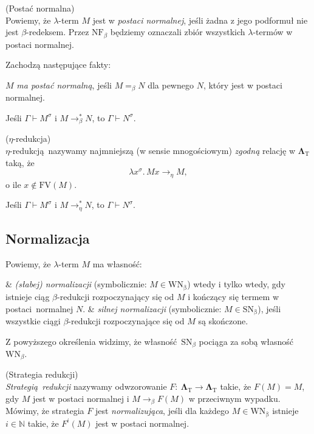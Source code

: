 \begin{definicja}\label{def:postac-normalna}(Postać normalna)\\
  Powiemy, że \(\lambda\)-term \(M\) jest w \emph{postaci normalnej}, jeśli żadna z jego podformuł nie jest \(\beta\)-redeksem. Przez \(\mathrm{NF}_{\beta}\) będziemy oznaczali zbiór wszystkich \(\lambda\)-termów w postaci normalnej.
\end{definicja}    

Zachodzą następujące fakty:
\begin{fakt}
\(M\) \emph{ma postać normalną}, jeśli \(M=_{\beta}N\) dla pewnego \(N\), który jest w postaci normalnej.
\end{fakt}
\begin{fakt}
  Jeśli \(\Gamma\vdash M^\sigma\) i \(M\longrightarrow^{*}_{\beta}N\), to
  \(\Gamma\vdash N^\sigma\).
\end{fakt}
  
  \begin{definicja}(\(\eta\)-redukcja)\\
\(\eta\)-redukcją nazywamy najmniejszą (w sensie mnogościowym) \emph{zgodną} relację w \(\mathbf{\Lambda}_{\mathrm{T}}\) taką, że
  \[
    \lambda x^\sigma.\, Mx\longrightarrow_{\eta} M,
  \]
    o ile \(x\not\in \mathrm{FV}(M)\).
  \end{definicja}

  \begin{fakt}
    Jeśli \(\Gamma\vdash M^\sigma\) i \(M\longrightarrow^{*}_{\eta}N\), to
    \(\Gamma\vdash N^\sigma\).
  \end{fakt}

\subsection{Normalizacja}
\noindent Powiemy, że \(\lambda\)-term \(M\) ma własność:
\begin{easylist}
  & \emph{(słabej) normalizacji} (symbolicznie: \(M\in\mathrm{WN_{\beta}}\)) wtedy i tylko wtedy, gdy istnieje ciąg \(\beta\)-redukcji rozpoczynający się od \(M\) i kończący się termem w postaci normalnej \(N\). 
  &  \emph{silnej normalizacji} (symbolicznie: \(M\in\mathrm{SN_{\beta}}\)), jeśli wszystkie ciągi \(\beta\)-redukcji rozpoczynające się od \(M\) są skończone.
\end{easylist}
\noindent Z powyższego określenia  widzimy, że własność \(\mathrm{SN}_{\beta}\) pociąga za sobą własność \(\mathrm{WN}_{\beta}\).

\begin{definicja}(Strategia redukcji)\\
\emph{Strategią redukcji} nazywamy odwzorowanie \(F:\:\mathbf{\Lambda}_{\mathrm{T}}\longrightarrow\mathbf{\Lambda}_{\mathrm{T}}\) takie, że \(F(M)=M\), gdy \(M\) jest w postaci normalnej i \(M\to_{\beta}F(M)\) w przeciwnym wypadku. Mówimy, że strategia \(F\) jest \emph{normalizująca}, jeśli dla każdego \(M\in \mathrm{WN_\beta}\) istnieje \(i\in\mathbb{N}\) takie, że \(F^i (M)\) jest w postaci normalnej.
\end{definicja}

